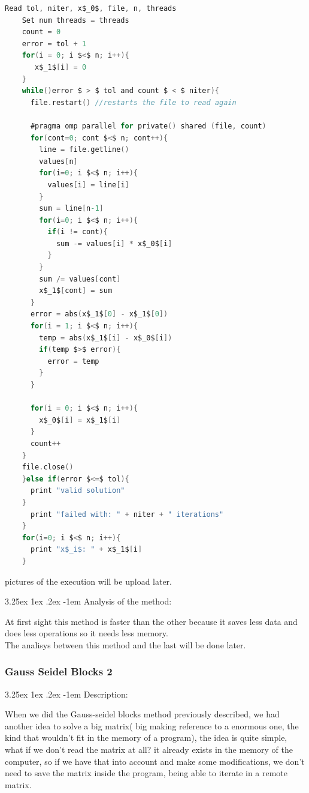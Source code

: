 \documentclass{article}
\makeatletter
\renewcommand\paragraph{\@startsection{paragraph}{5}{\z@}%
  {3.25ex \@plus1ex \@minus.2ex}%
  {-1em}%
  {\normalfont\normalsize\bfseries}}
\makeatother
\begin{document}
\begin{lstlisting}[language=C]
    Read tol, niter, x$_0$, file, n, threads
    Set num threads = threads
    count = 0
    error = tol + 1 
    for(i = 0; i $<$ n; i++){
       x$_1$[i] = 0
    }
    while()error $ > $ tol and count $ < $ niter){
      file.restart() //restarts the file to read again

      #pragma omp parallel for private() shared (file, count) 
      for(cont=0; cont $<$ n; cont++){
        line = file.getline()
        values[n]
        for(i=0; i $<$ n; i++){
          values[i] = line[i]
        }
        sum = line[n-1]
        for(i=0; i $<$ n; i++){
          if(i != cont){
            sum -= values[i] * x$_0$[i]
          }
        }
        sum /= values[cont]
        x$_1$[cont] = sum
      }
      error = abs(x$_1$[0] - x$_1$[0])
      for(i = 1; i $<$ n; i++){
        temp = abs(x$_1$[i] - x$_0$[i])
        if(temp $>$ error){
          error = temp
        }
      }
      
      for(i = 0; i $<$ n; i++){
        x$_0$[i] = x$_1$[i]
      }
      count++
    }
    file.close()
    }else if(error $<=$ tol){
      print "valid solution"
    }
      print "failed with: " + niter + " iterations"
    }
    for(i=0; i $<$ n; i++){
      print "x$_i$: " + x$_1$[i]
    }
\end{lstlisting}

pictures of the execution will be upload later.

\paragraph{Analysis of the method:}

\hfill \break
At first sight this method is faster than the other because it saves less data and does less operations so it needs less memory.\\

The analisys between this method and the last will be done later.


\subsubsection{Gauss Seidel Blocks 2}

\paragraph{Description:}
\hfill \break

When we did the Gauss-seidel blocks method previously described, we had another idea to solve a big matrix( big making reference to a 
enormous one, the kind that wouldn't fit in the memory of a program), the idea is quite simple, what if we don't read the matrix at all?
it already exists in the memory of the computer, so if we have that into account and make some modifications, we don't need to save the matrix inside
the program, being able to iterate in a remote matrix.
\end{document}
